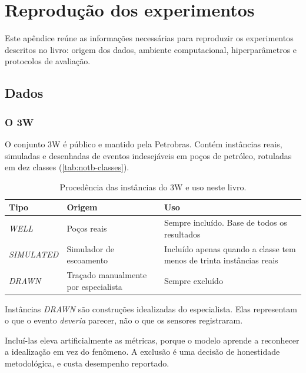 \chapter{Reprodução dos experimentos}
\label{cap:reproducao}

Este apêndice reúne as informações necessárias para reproduzir os experimentos
descritos no livro: origem dos dados, ambiente computacional, hiperparâmetros e
protocolos de avaliação.

\section{Dados}

\subsection{O 3W}

O conjunto 3W é público e mantido pela Petrobras. Contém instâncias reais, simuladas e
desenhadas de eventos indesejáveis em poços de petróleo, rotuladas em dez classes
(\cref{tab:notb-classes}).

\begin{table}[htbp]
\centering
\caption{Procedência das instâncias do 3W e uso neste livro.}
\label{tab:rep-instancias}
\small
\begin{tabular}{lp{5.0cm}p{4.6cm}}
\toprule
\textbf{Tipo} & \textbf{Origem} & \textbf{Uso} \\
\midrule
\emph{WELL} & Poços reais &
Sempre incluído. Base de todos os resultados \\
\addlinespace
\emph{SIMULATED} & Simulador de escoamento &
Incluído apenas quando a classe tem menos de trinta instâncias reais \\
\addlinespace
\emph{DRAWN} & Traçado manualmente por especialista &
Sempre excluído \\
\bottomrule
\end{tabular}
\end{table}

\begin{destaque}
Instâncias \emph{DRAWN} são construções idealizadas do especialista. Elas representam o
que o evento \emph{deveria} parecer, não o que os sensores registraram.

Incluí-las eleva artificialmente as métricas, porque o modelo aprende a reconhecer a
idealização em vez do fenômeno. A exclusão é uma decisão de honestidade metodológica, e
custa desempenho reportado.
\end{destaque}

